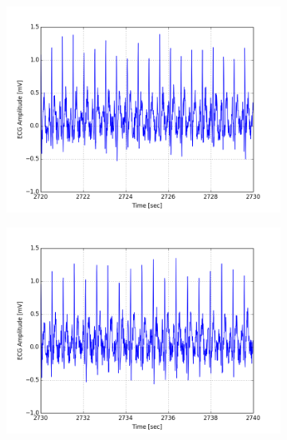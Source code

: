 \documentclass[paper=a4, fontsize=11pt]{scrartcl}
\numberwithin{equation}{section}		%
\numberwithin{figure}{section}			%
\numberwithin{table}{section}		    %
\begin{document}
\begin{appendices}
\begin{figure}[H]
	\centering
	\begin{subfigure}[b]{0.3\textwidth}
		\includegraphics[width=\textwidth]{sim/ecg_43}
	\end{subfigure}
	\begin{subfigure}[b]{0.3\textwidth}
		\includegraphics[width=\textwidth]{sim/ecg_44}
	\end{subfigure}
	\begin{subfigure}[b]{0.3\textwidth}

\end{subfigure}
\end{figure}
\end{appendices}
\end{document}
